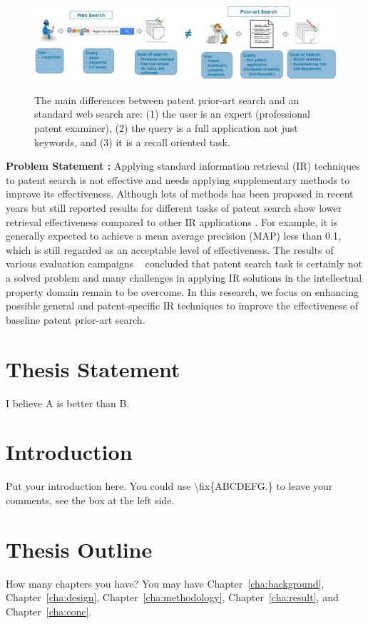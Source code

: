 \begin{figure}[htpb]
   \centering
   \includegraphics[width=\textwidth,height=35mm]{figs/webprior.jpg}
   \caption{The main differences between patent prior-art search and an standard web search are: (1) the user is an expert (professional patent examiner), (2) the query is a full application not just keywords, and (3) it is a recall oriented task.}  
   \label{fig:compareappr} 
\end{figure}
\FloatBarrier 
\noindent
\textbf{Problem Statement :}
Applying standard information retrieval (IR) techniques to patent search is not effective and needs applying supplementary methods to improve its effectiveness. Although lots of methods has been proposed in recent years but still reported results for different tasks of patent search show lower retrieval effectiveness compared to other IR applications \citep{lupu2013patent}. For example, it is generally expected to achieve a mean average precision (MAP) less than 0.1, which is still regarded as an acceptable level of effectiveness. The results of various evaluation campaigns ~\citep{lupu2013patent,joho2010survey, roda2010clef, DBLP:conf/clef/PiroiLHSMF12} concluded that patent search task is certainly not a solved problem and many challenges in applying IR solutions in the intellectual property domain remain to be overcome. In this research, we focus on enhancing possible general and patent-specific IR techniques to improve the effectiveness of baseline patent prior-art search. 


\section{Thesis Statement}
\label{sec:thesisstatement}
I believe A is better than B.


\section{Introduction}
\label{sec:problemstatement}
Put your introduction here. You could use \textbackslash fix\{ABCDEFG.\} to
leave your comments, see the box at the left side.  



\section{Thesis Outline}
\label{sec:outline}
How many chapters you have? You may have Chapter~\ref{cha:background},
Chapter~\ref{cha:design}, Chapter~\ref{cha:methodology},
Chapter~\ref{cha:result}, and Chapter~\ref{cha:conc}.

